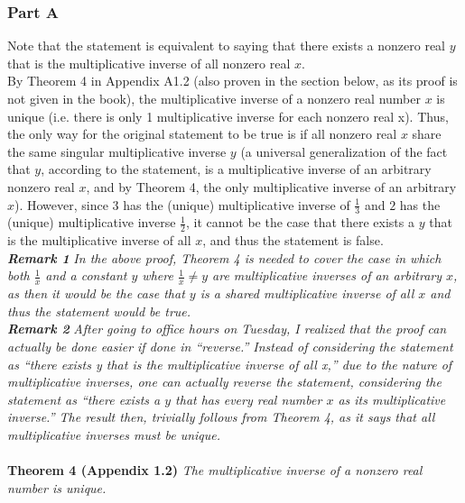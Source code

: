 \documentclass[table]{article}
\begin{document}
\subsubsection{Part A}
Note that the statement is equivalent to saying that there exists a nonzero real $y$ that is the multiplicative inverse of all nonzero real $x$.\\
By Theorem 4 in Appendix A1.2 (also proven in the section below, as its proof is not given in the book), the multiplicative inverse of a nonzero real number $x$ is unique (i.e. there is only 1 multiplicative inverse for each nonzero real x). Thus, the only way for the original statement to be true is if all nonzero real $x$ share the same singular multiplicative inverse $y$ (a universal generalization of the fact that $y$, according to the statement, is a multiplicative inverse of an arbitrary nonzero real $x$, and by Theorem 4, the only multiplicative inverse of an arbitrary $x$).
 However, since $3$ has the (unique) multiplicative inverse of $\frac{1}{3}$ and $2$ has the (unique) multiplicative inverse $\frac{1}{2}$, it cannot be the case that there exists a $y$ that is the multiplicative inverse of all $x$, and thus the statement is false.\\
\textbf{\textit{Remark 1}}
\textit{In the above proof, Theorem 4 is needed to cover the case in which both $\frac{1}{x}$ and a constant $y$ where $\frac{1}{x} \neq y$ are multiplicative inverses of an arbitrary $x$, as then it would be the case that $y$ is a shared multiplicative inverse of all $x$ and thus the statement would be true.}\\
\textbf{\textit{Remark 2}}
\textit{After going to office hours on Tuesday, I realized that the proof can actually be done easier if done in ``reverse.'' Instead of considering the statement as ``there exists y that is the multiplicative inverse of all x,'' due to the nature of multiplicative inverses, one can actually reverse the statement, considering the statement as ``there exists a $y$ that has every real number $x$ as its multiplicative inverse.'' The result then, trivially follows from Theorem 4, as it says that all multiplicative inverses must be unique.}\\~\\
\textbf{Theorem 4 (Appendix 1.2)}
\textit{The multiplicative inverse of a nonzero real number is unique.}
\end{document}
